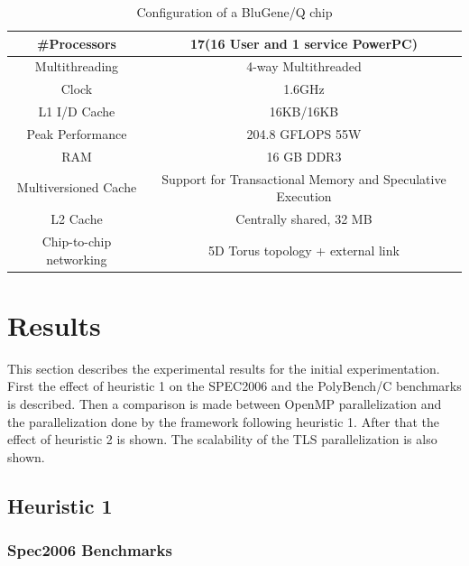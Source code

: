 \documentclass[10pt]{report}          %
\begin{document}
\begin{table}
\centering
\caption{Configuration of a BluGene/Q chip}
\begin{tabular}{|c||c|} \hline
\#Processors&17(16 User and 1 service PowerPC)\\ \hline 
Multithreading&4-way Multithreaded \\ \hline
Clock&1.6GHz \\ \hline
L1 I/D Cache&16KB/16KB \\ \hline
Peak Performance & 204.8 GFLOPS \@ 55W \\ \hline
RAM&16 GB DDR3 \\ \hline
Multiversioned Cache & Support for Transactional Memory and Speculative Execution \\ \hline
L2 Cache & Centrally shared, 32 MB \\ \hline
Chip-to-chip networking & 5D Torus topology + external link \\ \hline
\hline\end{tabular}
\label{table:bgq_config}
\end{table}

\section{Results}
\label{section:results}

This section describes the experimental results for the initial experimentation.  First the effect of heuristic 1 on the SPEC2006 and the PolyBench/C benchmarks is described.  Then a comparison is made between OpenMP parallelization and the parallelization done by the framework following heuristic 1.  After that the effect of heuristic 2 is shown.  The scalability of the TLS parallelization is also shown.

\subsection{Heuristic 1}

\subsubsection{Spec2006 Benchmarks}
\end{document}
